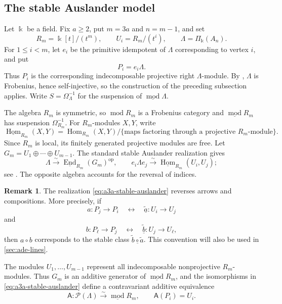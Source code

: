 \documentclass[a4paper,11pt,reqno]{amsart}
\theoremstyle{definition}
\newtheorem{remark}[remark]{Remark}
\theoremstyle{plain}
\numberwithin{equation}{section}
\newcommand{\Hom}{\operatorname{Hom}}
\newcommand{\End}{\operatorname{End}}
\newcommand{\kk}{\Bbbk}
\begin{document}
\subsection{The stable Auslander model}
\label{sec:uniform-a3a}

Let \(\kk\) be a field.  Fix \(a\ge2\), put \(m=3a\) and
\(n=m-1\), and set
\[
 R_m=\kk[t]/(t^m),\qquad U_i=R_m/(t^i),\qquad
 \Lambda=\Pi_\kk(A_n).
\]
For \(1\le i<m\), let \(e_i\) be the primitive idempotent of \(\Lambda\)
corresponding to vertex \(i\), and put
\[
 P_i=e_i\Lambda.
\]
Thus \(P_i\) is the corresponding indecomposable projective right
\(\Lambda\)-module.  By
\cite[Theorem~4.8]{BrennerButlerKing2002}, \(\Lambda\) is Frobenius,
hence self-injective, so the construction of the preceding subsection
applies.  Write \(S=\Omega_\Lambda^{-1}\) for the suspension of
\(\underline{\operatorname{mod}}\Lambda\).

The algebra \(R_m\) is symmetric, so \(\operatorname{mod}R_m\) is a
Frobenius category and
\(\underline{\operatorname{mod}}R_m\) has suspension
\(\Omega_{R_m}^{-1}\).  For \(R_m\)-modules \(X,Y\), write
\[
 \underline{\Hom}_{R_m}(X,Y)
 =\Hom_{R_m}(X,Y)/
 \{\text{maps factoring through a projective \(R_m\)-module}\}.
\]
Since \(R_m\) is local, its finitely generated projective modules are
free.  Let \(G_m=U_1\oplus\cdots\oplus U_{m-1}\).  The standard stable
Auslander realization gives
\begin{equation}
\label{eq:a3a-stable-auslander}
 \Lambda\xrightarrow{\sim}
 \underline{\End}_{R_m}(G_m)^{\mathrm{op}},
 \qquad
 e_i\Lambda e_j\xrightarrow{\sim}
 \underline{\Hom}_{R_m}(U_i,U_j);
\end{equation}
see \cite[Section~7, pp.~219--220]{DlabRingel1992}.  The opposite algebra
accounts for the reversal of indices.

\begin{remark}
\label{rem:a3a-opposite-convention}
The realization \eqref{eq:a3a-stable-auslander} reverses arrows and
compositions.  More precisely, if
\[
 a:P_j\longrightarrow P_i
 \quad\longleftrightarrow\quad
 \underline{\widetilde a}:U_i\longrightarrow U_j
\]
and
\[
 b:P_\ell\longrightarrow P_j
 \quad\longleftrightarrow\quad
 \underline{\widetilde b}:U_j\longrightarrow U_\ell,
\]
then \(a\circ b\) corresponds to the stable class
\(\underline{\widetilde b\circ\widetilde a}\).  This convention will
also be used in \cref{sec:ade-lines}.
\end{remark}

The modules \(U_1,\ldots,U_{m-1}\) represent all indecomposable
nonprojective \(R_m\)-modules.  Thus \(G_m\) is an additive generator of
\(\underline{\operatorname{mod}}R_m\), and the isomorphisms in
\eqref{eq:a3a-stable-auslander} define a contravariant additive
equivalence
\[
 \mathsf A:\mathcal P(\Lambda)\xrightarrow{\sim}
 \underline{\operatorname{mod}}R_m,
 \qquad
 \mathsf A(P_i)=U_i.
\]
\end{document}
